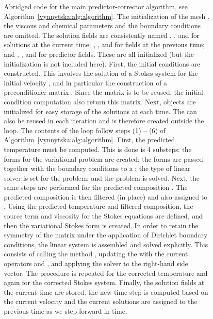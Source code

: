 \begin{figure}
    \caption{Abridged code for the main predictor-corrector algorithm,
      see Algorithm~\ref{vynnytska:alg:algorithm}. The initialization
      of the mesh , the viscous and chemical parameters and
      the boundary conditions are omitted. The solution fields are
      consistently named , , and  for
      solutions at the current time; , ,
      and  for fields at the previous time;
      and , , and  for predictor
      fields. These  are all initialized (but the
      initialization is not included here).
%
      First, the initial conditions are constructed. This involves the
      solution of a Stokes system for the initial velocity ,
      and in particular the construction of a preconditioner matrix
      . Since the matrix is to be reused, the initial
      condition computation also return this matrix. Next,
       objects are initialized for easy storage of
      the solutions at each time. The  can also be
      reused in each iteration and is therefore created outside the
      loop.
%
      The contents of the loop follow steps (1) -- (6) of
      Algorithm~\ref{vynnytska:alg:algorithm}. First, the predicted
      temperature  must be computed. This is done is 4
      substeps: the forms for the variational problem are created;
      the forms are passed together with the boundary conditions to a
      ; the type of linear solver is set for
      the problem; and the problem is solved. Next, the same steps are
      performed for the predicted composition . The
      predicted composition is then filtered (in place) and also
      assigned to .
%
      Using the predicted temperature and filtered composition, the
      source term and viscosity for the Stokes equations are defined,
      and then the variational Stokes form is created. In order to
      retain the symmetry of the matrix under the application of
      Dirichlet boundary conditions, the linear system is assembled
      and solved explicitly. This consists of calling the method
      , updating the  with
      the current operators  and , and applying the
      solver to the right-hand side vector. The procedure is repeated
      for the corrected temperature and again for the corrected Stokes
      system.
%
      Finally, the solution fields at the current time are stored, the
      new time step  is computed based on the current velocity
      and the current solutions are assigned to the previous time as
      we step forward in time.}
  \label{vynnytska:fig:mainalgorithm}
\end{figure}

